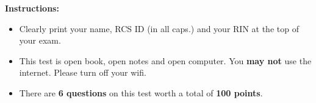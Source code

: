 \documentclass[10pt]{article}
\begin{document}
\vspace*{.45in} 

{\large\bf Instructions:}
\begin{itemize}
\item Clearly print your name, RCS ID (in all caps.) and your RIN at the top of your exam.
\item This test is open book, open notes and open computer. You \textbf{may not} use the internet. Please turn off your wifi.
\item There are \textbf{6 questions} on this test worth a total of
  \textbf{100 points}.
\end{itemize}


\newpage


\fi
\end{document}
